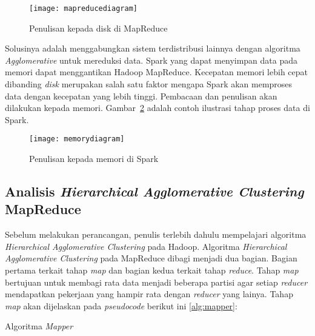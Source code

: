 \begin{figure}[H]
    \centering  
    \texttt{[image: mapreducediagram]}  
    \caption[Penulisan kepada disk di MapReduce]{Penulisan kepada disk di MapReduce} 
    \label{fig:mapreducediagram} 
\end{figure}


Solusinya adalah menggabungkan sistem terdistribusi lainnya dengan  algoritma \textit{Agglomerative} untuk mereduksi data. Spark yang dapat menyimpan data pada memori dapat menggantikan Hadoop MapReduce. Kecepatan memori lebih cepat dibanding \textit{disk} merupakan salah satu faktor mengapa Spark akan memproses data dengan kecepatan yang lebih tinggi.  Pembacaan dan penulisan akan dilakukan kepada memori. Gambar~\ref{fig:memorydiagram} adalah contoh ilustrasi tahap proses data di Spark. 
	
\begin{figure}[H]
    \centering  
    \texttt{[image: memorydiagram]}  
    \caption[Penulisan kepada memori di Spark]{Penulisan kepada memori di Spark} 
    \label{fig:memorydiagram} 
\end{figure}

 
\subsection{Analisis \textit{Hierarchical Agglomerative Clustering} MapReduce}

Sebelum melakukan perancangan, penulis terlebih dahulu mempelajari algoritma \textit{Hierarchical Agglomerative Clustering} pada Hadoop. Algoritma \textit{Hierarchical Agglomerative Clustering}  pada MapReduce dibagi menjadi dua bagian. Bagian pertama terkait tahap \textit{map} dan bagian kedua terkait tahap \textit{reduce}. Tahap \textit{map} bertujuan untuk membagi rata data menjadi beberapa partisi agar setiap \textit{reducer} mendapatkan pekerjaan yang hampir rata dengan \textit{reducer} yang lainya. Tahap \textit{map} akan dijelaskan pada \textit{pseudocode} berikut ini \ref{alg:mapper}:\\

\begin{algorithm}[H]
	\DontPrintSemicolon\SetAlgoNoLine\LinesNumbered
	\BlankLine
	
	
	\caption{Algoritma \textit{Mapper}}
	\label{alg:mapper}
\end{algorithm}

